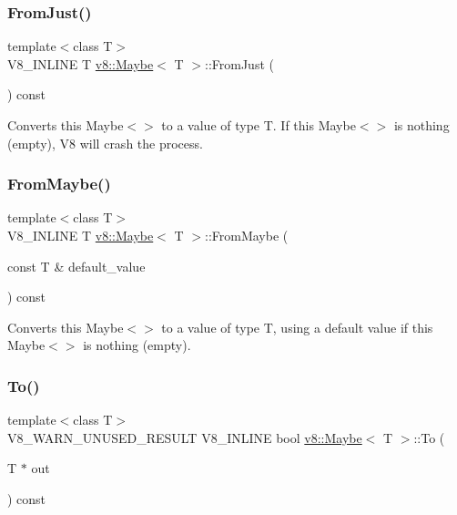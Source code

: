 \subsubsection{\texorpdfstring{From\+Just()}{FromJust()}}
{\footnotesize\ttfamily template$<$class T$>$ \\
V8\+\_\+\+I\+N\+L\+I\+NE T \mbox{\hyperlink{classv8_1_1Maybe}{v8\+::\+Maybe}}$<$ T $>$\+::From\+Just (\begin{DoxyParamCaption}{ }\end{DoxyParamCaption}) const\hspace{0.3cm}{\ttfamily [inline]}}

Converts this Maybe$<$$>$ to a value of type T. If this Maybe$<$$>$ is nothing (empty), V8 will crash the process. \mbox{\label{classv8_1_1Maybe_a4b95361b73d9af3dddd975accca89a5f}} 
\subsubsection{\texorpdfstring{From\+Maybe()}{FromMaybe()}}
{\footnotesize\ttfamily template$<$class T$>$ \\
V8\+\_\+\+I\+N\+L\+I\+NE T \mbox{\hyperlink{classv8_1_1Maybe}{v8\+::\+Maybe}}$<$ T $>$\+::From\+Maybe (\begin{DoxyParamCaption}\item[{const T \&}]{default\+\_\+value }\end{DoxyParamCaption}) const\hspace{0.3cm}{\ttfamily [inline]}}

Converts this Maybe$<$$>$ to a value of type T, using a default value if this Maybe$<$$>$ is nothing (empty). \mbox{\label{classv8_1_1Maybe_a7d1d77e5fd55f125fb4c41db1335bd09}} 
\subsubsection{\texorpdfstring{To()}{To()}}
{\footnotesize\ttfamily template$<$class T$>$ \\
V8\+\_\+\+W\+A\+R\+N\+\_\+\+U\+N\+U\+S\+E\+D\+\_\+\+R\+E\+S\+U\+LT V8\+\_\+\+I\+N\+L\+I\+NE bool \mbox{\hyperlink{classv8_1_1Maybe}{v8\+::\+Maybe}}$<$ T $>$\+::To (\begin{DoxyParamCaption}\item[{T $\ast$}]{out }\end{DoxyParamCaption}) const\hspace{0.3cm}{\ttfamily [inline]}}

